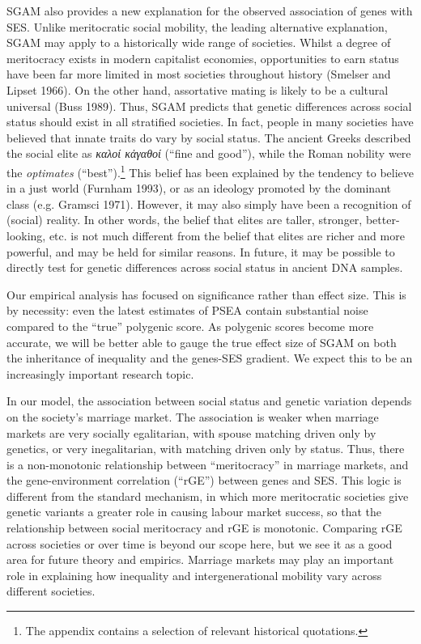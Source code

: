 \documentclass[
]{article}
\begin{document}
SGAM also provides a new explanation for the observed association of genes with
SES. Unlike meritocratic social mobility, the leading alternative explanation,
SGAM may apply to a historically wide range of societies. Whilst a
degree of meritocracy exists in modern capitalist economies, opportunities to
earn status have been far more limited in most societies throughout history
(Smelser and Lipset 1966). On the other hand, assortative mating is likely to be a
cultural universal (Buss 1989). Thus, SGAM predicts that genetic differences
across social status should exist in all stratified societies. In fact, people
in many societies have believed that innate traits do vary by social
status. The ancient Greeks described the social elite as \emph{καλοί κἀγαθοί} (``fine
and good''), while the Roman nobility were the \emph{optimates} (``best'').\footnote{The appendix contains a selection of relevant historical
  quotations.} This
belief has been explained by the tendency to believe in a just world
(Furnham 1993), or as an ideology promoted by the dominant class (e.g. Gramsci 1971). However, it may also simply have been a recognition of
(social) reality. In other words, the belief that elites are taller, stronger,
better-looking, etc. is not much different from the belief that elites are
richer and more powerful, and may be held for similar reasons. In future, it
may be possible to directly test for genetic differences across social status
in ancient DNA samples.

Our empirical analysis has focused on significance rather than effect size. This
is by necessity: even the latest estimates of PSEA contain substantial noise
compared to the ``true'' polygenic score. As polygenic scores become more accurate,
we will be better able to gauge the true effect size of SGAM on both the
inheritance of inequality and the genes-SES gradient. We expect this to be
an increasingly important research topic.

In our model, the association between social status and genetic variation
depends on the society's marriage market. The association is weaker when
marriage markets are very socially egalitarian, with spouse matching driven only
by genetics, or very inegalitarian, with matching driven only by status. Thus,
there is a non-monotonic relationship between ``meritocracy'' in marriage markets,
and the gene-environment correlation (``rGE'') between genes and SES. This logic
is different from the standard mechanism, in which more meritocratic societies
give genetic variants a greater role in causing labour market success, so that
the relationship between social meritocracy and rGE is monotonic. Comparing rGE
across societies or over time is beyond our scope here, but we see it as a good
area for future theory and empirics. Marriage markets may play an important role
in explaining how inequality and intergenerational mobility vary across
different societies.
\end{document}
